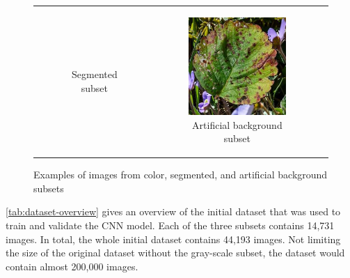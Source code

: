 \documentclass{BachelorBUI}
\begin{document}
\begin{figure}[h]
\begin{tabular}{ccc}
\begin{subfigure}[t]{0.30\textwidth}
                    \caption{\centering Segmented subset}
                \end{subfigure} &
                \begin{subfigure}[t]{0.30\textwidth}
                    \centering
                    \includegraphics[width=\textwidth]{artificial_strawberry_leaf_scorch.jpg}
                    \caption{\centering Artificial background subset}
                \end{subfigure} \\
            \end{tabular}
            \caption{\centering Examples of images from color, segmented, and artificial background subsets}
            \label{fig:dataset-image-examples}
        \end{figure}

        \autoref{tab:dataset-overview} gives an overview of the initial dataset that was used to train and validate the CNN model. Each of the three subsets contains 14,731 images. In total, the whole initial dataset contains 44,193 images. Not limiting the size of the original dataset without the gray-scale subset, the dataset would contain almost 200,000 images.
\end{document}
